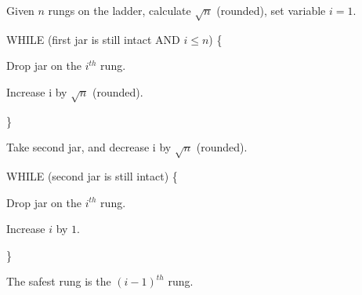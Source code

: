 \documentclass[11pt]{article}
\begin{document}
Given $n$ rungs on the ladder, calculate $\sqrt{n}$ (rounded), set variable $i = 1$.

WHILE (first jar is still intact AND $i \le n$) \{

\indent \indent Drop jar on the $i^{th}$ rung.

\indent \indent Increase i by $\sqrt{n}$ (rounded).

\}

Take second jar, and decrease i by $\sqrt{n}$ (rounded).

WHILE (second jar is still intact) \{

\indent \indent Drop jar on the $i^{th}$ rung.

\indent \indent Increase $i$ by $1$.

\}

The safest rung is the ${(i-1)}^{th}$ rung.
\end{document}

